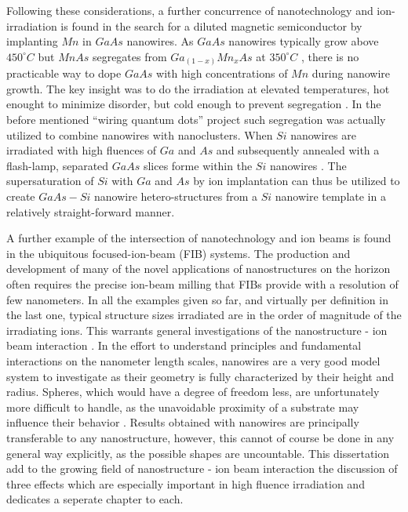 Following these considerations, a further concurrence of nanotechnology and ion-irradiation is found in the search for a diluted magnetic semiconductor by implanting $Mn$ in $GaAs$ nanowires. As $GaAs$ nanowires typically grow above $450^\circ C$ but $MnAs$ segregates from $Ga_{(1-x)}Mn_xAs$ at $350^\circ C$ \cite{dietl_engineering_2006,sadowski_gaasmnas_2011}, there is no practicable way to dope $GaAs$ with high concentrations of $Mn$ during nanowire growth. The key insight was to do the irradiation at elevated temperatures, hot enought to minimize disorder, but cold enough to prevent segregation  \cite{borschel_new_2011,paschoal_hopping_2012,borschel_ion-solid_2012,kumar_magnetic_2013,paschoal_magnetoresistance_2014}.  In the before mentioned ``wiring quantum dots'' project such segregation was actually utilized to combine nanowires with nanoclusters. When $Si$ nanowires are irradiated with high fluences of $Ga$ and $As$ and subsequently annealed with a flash-lamp, separated $GaAs$ slices forme within the $Si$ nanowires \cite{prucnal_iii-v_2014,glaser_personal_2015}. The supersaturation of $Si$ with $Ga$ and $As$ by ion implantation can thus be utilized to create $GaAs - Si$ nanowire hetero-structures from a $Si$ nanowire template in a relatively straight-forward manner.
 
A further example of the intersection of nanotechnology and ion beams is found in the ubiquitous focused-ion-beam (FIB) systems. The production and development of many of the novel applications of nanostructures on the horizon often requires the precise ion-beam milling that FIBs provide with a resolution of few nanometers. In all the examples given so far, and virtually per definition in the last one, typical structure sizes irradiated are in the order of magnitude of the irradiating ions. This warrants general investigations of the nanostructure - ion beam interaction \cite{borschel_ion-solid_2012,greaves_enhanced_2013,nietiadi_sputtering_2014,johannes_ion_2015}. In the effort to understand principles and fundamental interactions on the nanometer length scales, nanowires are a very good model system to investigate as their geometry is fully characterized by their height and radius. Spheres, which would have a degree of freedom less, are unfortunately more difficult to handle, as the unavoidable proximity of a substrate may influence their behavior \cite{moller_tri3dyn_2014,johannes_ion_2015}. Results obtained with nanowires are principally transferable to any nanostructure, however, this cannot of course be done in any general way explicitly, as the possible shapes are uncountable. This dissertation add to the growing field of nanostructure - ion beam interaction the discussion of three effects which are especially important in high fluence irradiation and dedicates a seperate chapter to each. 
 
